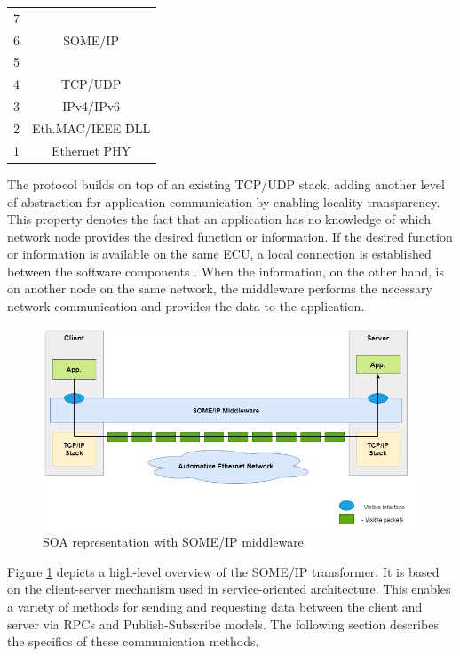 \begin{center}
		\begin{tabular}{|c|c|}
		\hline
			7 & \\
			6 & SOME/IP \\
			5 & \\
		\hline
			4 & TCP/UDP \\
		\hline
			3 & IPv4/IPv6 \\
		\hline
		2 & Eth.MAC/IEEE DLL \\
		\hline
		1 & Ethernet PHY \\
		\hline			
		\end{tabular}
	\label{ISO_OSI_Model}
\end{center}

The protocol builds on top of an existing TCP/UDP stack, adding another level of abstraction for application communication by enabling locality transparency. This property denotes the fact that an application has no knowledge of which network node provides the desired function or information. If the desired function or information is available on the same ECU, a local connection is established between the software components \cite{b1.4}. When the information, on the other hand, is on another node on the same network, the middleware performs the necessary network communication and provides the data to the application.

\begin{figure}[!htb]
	\centering
		\includegraphics[width=1\textwidth]{images/SOMEIP_Middleware.png}
	\caption{SOA representation with SOME/IP middleware}
	\label{fig:SOMEIP_Middleware}
\end{figure}

Figure \ref{fig:SOMEIP_Middleware} depicts a high-level overview of the SOME/IP transformer. It is based on the client-server mechanism used in service-oriented architecture. This enables a variety of methods for sending and requesting data between the client and server via RPCs and Publish-Subscribe models. The following section describes the specifics of these communication methods.


